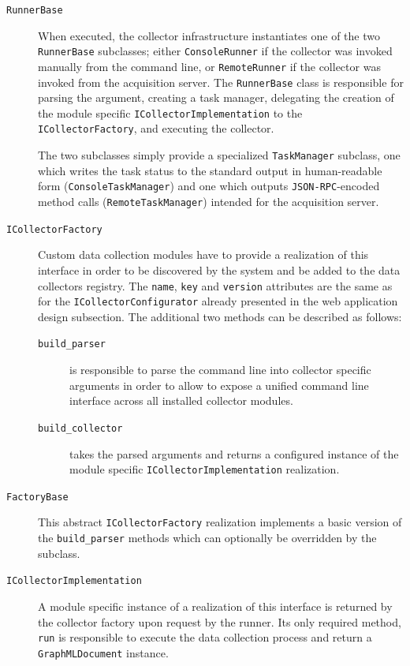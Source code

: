\begin{description}
  \item[\texttt{RunnerBase}] When executed, the collector infrastructure instantiates one of the two \texttt{Runner\BreakableSlash{}Base} subclasses; either \texttt{ConsoleRunner} if the collector was invoked manually from the command line, or \texttt{RemoteRunner} if the collector was invoked from the acquisition server. The \texttt{RunnerBase} class is responsible for parsing the argument, creating a task manager, delegating the creation of the module specific \texttt{ICollectorImplementation} to the \texttt{ICollectorFactory}, and executing the collector.

    The two subclasses simply provide a specialized \texttt{TaskManager} subclass, one which writes the task status to the standard output in human-readable form (\texttt{ConsoleTask\BreakableSlash{}Manager}) and one which outputs \texttt{JSON-RPC}-encoded method calls (\texttt{RemoteTask\BreakableSlash{}Manager}) intended for the acquisition server.
  \item[\texttt{ICollectorFactory}] Custom data collection modules have to provide a realization of this interface in order to be discovered by the system and be added to the data collectors registry. The \texttt{name}, \texttt{key} and \texttt{version} attributes are the same as for the \texttt{ICollector\BreakableSlash{}Configurator} already presented in the web application design subsection. The additional two methods can be described as follows:
    \begin{description}
      \item[\texttt{build\_parser}] is responsible to parse the command line into collector specific arguments in order to allow to expose a unified command line interface across all installed collector modules.
      \item[\texttt{build\_collector}] takes the parsed arguments and returns a configured instance of the module specific \texttt{ICollectorImplementation} realization.
    \end{description}
  \item[\texttt{FactoryBase}] This abstract \texttt{ICollectorFactory} realization implements a basic version of the \texttt{build\_parser} methods which can optionally be overridden by the subclass.
  \item[\texttt{ICollectorImplementation}] A module specific instance of a realization of this interface is returned by the collector factory upon request by the runner. Its only required method, \texttt{run} is responsible to execute the data collection process and return a \texttt{GraphMLDocument} instance.
\end{description}

